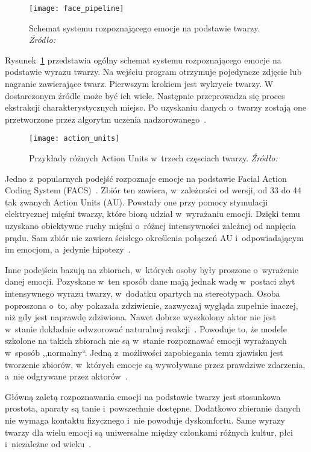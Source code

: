 \begin{figure}[h]
    \centering
    \texttt{[image: face\_pipeline]}
    \caption{Schemat systemu rozpoznającego emocje na podstawie twarzy. \textit{Źródło:~\cite{Ko2018}}}
    \label{fig:face-pipeline}
\end{figure}

Rysunek~\ref{fig:face-pipeline} przedstawia ogólny schemat systemu rozpoznającego emocje na podstawie wyrazu twarzy.
Na wejściu program otrzymuje pojedyncze zdjęcie lub nagranie zawierające twarz.
Pierwszym krokiem jest wykrycie twarzy.
W dostarczonym źródle może być ich wiele.
Następnie przeprowadza się proces ekstrakcji charakterystycznych miejsc.
Po uzyskaniu danych o~twarzy zostają one przetworzone przez algorytm uczenia nadzorowanego~\cite{Calvo2015}.

\begin{figure}[h]
    \centering
    \texttt{[image: action\_units]}
    \caption{Przykłady różnych Action Units w~trzech częsciach twarzy. \textit{Źródło:~\cite{Ko2018}}}
    \label{fig:action-units}
\end{figure}

Jedno z~popularnych podejść rozpoznaje emocje na podstawie Facial Action Coding System (FACS)~\cite{Ekman1978}.
Zbiór ten zawiera, w~zależności od wersji, od 33 do 44 tak zwanych Action Units (AU).
Powstały one przy pomocy stymulacji elektrycznej mięśni twarzy, które biorą udział w~wyrażaniu emocji.
Dzięki temu uzyskano obiektywne ruchy mięśni o~różnej intensywności zależnej od napięcia prądu.
Sam zbiór nie zawiera ścisłego określenia połączeń AU i~odpowiadającym im emocjom, a~jedynie hipotezy~\cite{Calvo2015}.

Inne podejścia bazują na zbiorach, w~których osoby były proszone o~wyrażenie danej emocji.
Pozyskane w~ten sposób dane mają jednak wadę w~postaci zbyt intensywnego wyrazu twarzy, w~dodatku opartych na stereotypach.
Osoba poproszona o~to, aby pokazała zdziwienie, zazwyczaj wygląda zupełnie inaczej, niż gdy jest naprawdę zdziwiona.
Nawet dobrze wyszkolony aktor nie jest w~stanie dokładnie odwzorować naturalnej reakcji~\cite{Calvo2015}.
Powoduje to, że modele szkolone na takich zbiorach nie są w~stanie rozpoznawać emocji wyrażanych w~sposób ,,normalny``.
Jedną z~możliwości zapobiegania temu zjawisku jest tworzenie zbiorów, w~których emocje są wywoływane przez prawdziwe zdarzenia, a~nie odgrywane przez aktorów~\cite{Calvo2015}.

Główną zaletą rozpoznawania emocji na podstawie twarzy jest stosunkowa prostota, aparaty są tanie i~powszechnie dostępne.
Dodatkowo zbieranie danych nie wymaga kontaktu fizycznego i~nie powoduje dyskomfortu.
Same wyrazy twarzy dla wielu emocji są uniwersalne między członkami różnych kultur, płci i~niezależne od wieku~\cite{Calvo2015}.

